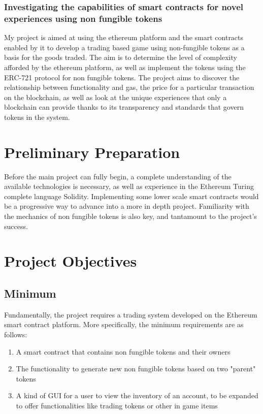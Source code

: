 \documentclass{article}
\begin{document}
\subsubsection*{Investigating the capabilities of smart contracts for novel experiences using non fungible tokens}
\vspace{5mm}
My project is aimed at using the ethereum platform and the smart contracts enabled by it to develop a trading based game using non-fungible tokens as a basis for the goods traded. The aim is to determine the level of complexity afforded by the ethereum platform, as well as implement the tokens using the ERC-721 protocol for non fungible tokens. The project aims to discover the relationship between functionality and gas, the price for a particular transaction on the blockchain, as well as look at the unique experiences that only a blockchain can provide thanks to its transparency and standards that govern tokens in the system.

\section{Preliminary Preparation}
Before the main project can fully begin, a complete understanding of the available technologies is necessary, as well as experience in the Ethereum Turing complete language Solidity. Implementing some lower scale smart contracts would be a progressive way to advance into a more in depth project. Familiarity with the mechanics of non fungible tokens is also key, and tantamount to the project's success. 

\section{Project Objectives}
\subsection*{Minimum}
Fundamentally, the project requires a trading system developed on the Ethereum smart contract platform. More specifically, the minimum requirements are as follows:
\begin{enumerate}
    \item A smart contract that contains non fungible tokens and their owners
    \item The functionality to generate new non fungible tokens based on two "parent" tokens
    \item  A kind of GUI for a user to view the inventory of an account, to be expanded to offer functionalities like trading tokens or other in game items
  
\end{enumerate}
\end{document}
